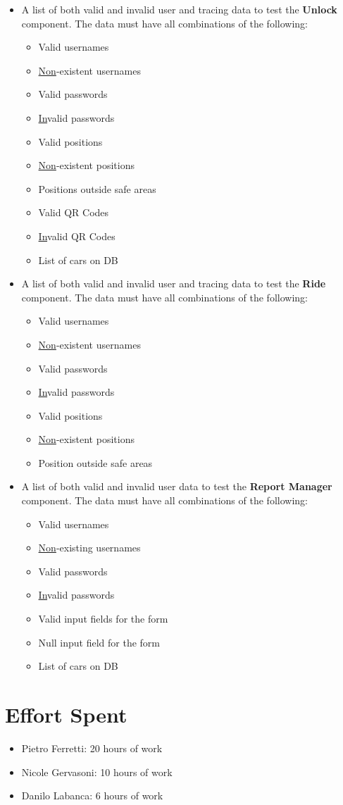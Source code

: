 \documentclass[english]{article}
\begin{document}
\begin{itemize}
     \item{A list of both valid and invalid user and tracing data to test the \textbf{Unlock} component.
   The data must have all combinations of the following:
     \begin{itemize}
       \item{Valid usernames}
       \item{\underline{Non}-existent usernames}
       \item{Valid passwords}
       \item{\underline{In}valid passwords}
       \item{Valid positions}
       \item{\underline{Non}-existent positions}
       \item{Positions outside safe areas}
       \item{Valid QR Codes}
       \item{\underline{In}valid QR Codes}
       \item{List of cars on DB}
     \end{itemize}}
 
     \item{A list of both valid and invalid user and tracing data to test the \textbf{Ride} component.
   The data must have all combinations of the following:
     \begin{itemize}
       \item{Valid usernames}
       \item{\underline{Non}-existent usernames}
       \item{Valid passwords}
       \item{\underline{In}valid passwords}
       \item{Valid positions}
       \item{\underline{Non}-existent positions}
       \item{Position outside safe areas}
     \end{itemize}}
 
     \item{A list of both valid and invalid user data to test the \textbf{Report Manager} component.
     The data must have all combinations of the following:
     \begin{itemize}
       \item{Valid usernames}
       \item{\underline{Non}-existing usernames}
       \item{Valid passwords}
       \item{\underline{In}valid passwords}
       \item{Valid input fields for the form}
       \item{Null input field for the form}
       \item{List of cars on DB}
     \end{itemize}}
 
 \end{itemize}

\newpage
\section{Effort Spent}
\begin{itemize}
	\item{Pietro Ferretti: 20 hours of work}
	\item{Nicole Gervasoni: 10 hours of work}
	\item{Danilo Labanca: 6 hours of work}
\end{itemize}
\end{document}
